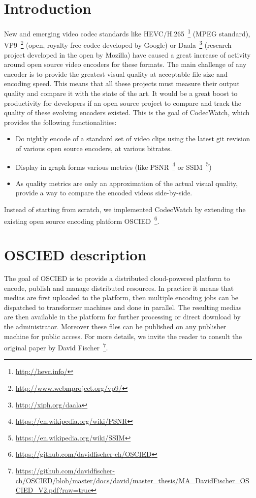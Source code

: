 \documentclass[a4paper,12pt]{article}
\begin{document}
%

\tableofcontents

\newpage

\section{Introduction}
  New and emerging video codec standards like
HEVC/H.265~\footnote{\url{http://hevc.info/}} (MPEG standard),
VP9~\footnote{\url{http://www.webmproject.org/vp9/}} (open, royalty-free codec developed
by Google) or Daala~\footnote{\url{http://xiph.org/daala}} (research project developed
in the open by Mozilla) have caused a great increase of activity around open
source video encoders for these formats. The main challenge of any encoder is to
provide the greatest visual quality at acceptable file size and encoding
speed. This means that all these projects must measure their output quality and
compare it with the state of the art. It would be a great boost to productivity
for developers if an open source project to compare and track the quality of
these evolving encoders existed. This is the goal of CodecWatch, which provides
the following functionalities:
\begin{itemize}
\item
  Do nightly encode of a standard set of video clips using the latest git
  revision of various open source encoders, at various bitrates.
\item
  Display in graph forms various metrics (like
  PSNR~\footnote{\url{https://en.wikipedia.org/wiki/PSNR}} or
  SSIM~\footnote{\url{https://en.wikipedia.org/wiki/SSIM}})
\item
  As quality metrics are only an approximation of the actual visual quality,
  provide a way to compare the encoded videos side-by-side.
\end{itemize}
Instead of starting from scratch, we implemented CodecWatch by extending the
existing open source encoding platform OSCIED~\footnote{\url{https://github.com/davidfischer-ch/OSCIED}}.

\section{OSCIED description}
The goal of OSCIED is to provide a distributed cloud-powered platform to encode, publish and manage distributed resources.
In practice it means that medias are first uploaded to the platform, then multiple encoding jobs can be dispatched to transformer machines and done in parallel.
The resulting medias are then available in the platform for further processing or direct download by the administrator.
Moreover these files can be published on any publisher machine for public access.
For more details, we invite the reader to consult the original paper by David
Fischer~\footnote{\url{https://github.com/davidfischer-ch/OSCIED/blob/master/docs/david/master_thesis/MA_DavidFischer_OSCIED_V2.pdf?raw=true}}.
\end{document}
